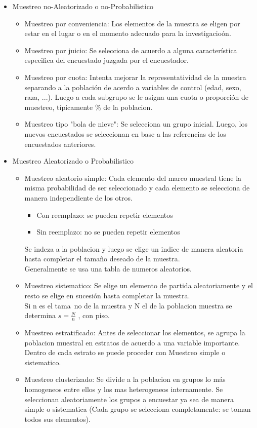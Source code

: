 		\begin{itemize}
			\item Muestreo no-Aleatorizado o no-Probabilistico
			\begin{itemize}
				\item Muestreo por conveniencia: Los elementos de la muestra se eligen por estar en el lugar o en el momento adecuado para la investigacio\'on. 
				\item Muestreo por juicio: Se selecciona de acuerdo a alguna caracter\'istica especifica del encuestado juzgada por el encuestador.
				\item Muestreo por cuota: Intenta mejorar la representatividad de la muestra separando a la poblaci\'on de acerdo a variables de control (edad, sexo, raza, ...). Luego a cada subgrupo se le asigna una cuota o proporci\'on de muestreo, t\'ipicamente \% de la poblacion.
				\item Muestreo tipo "bola de nieve": Se selecciona un grupo inicial. Luego, los nuevos encuestados se seleccionan en base a las referencias de los encuestados anteriores.
			\end{itemize}
			\item Muestreo Aleatorizado o Probabilistico
			\begin{itemize}
				\item Muestreo aleatorio simple: Cada elemento del marco muestral tiene la misma probabilidad de ser seleccionado y cada elemento se selecciona de manera independiente de los otros.
				 \begin{itemize}
					\item Con reemplazo: se pueden repetir elementos
					\item Sin reemplazo: no se pueden repetir elementos
				 \end{itemize}
				Se indeza a la poblacion y luego se elige un indice de manera aleatoria hasta completar el tama\~no deseado de la muestra.\\
				Generalmente se usa una tabla de numeros aleatorios.\\
				\item Muestreo sistematico: Se elige un elemento de partida aleatoriamente y el resto se elige en sucesi\'on hasta completar la muestra.\\
				Si n es el tama~no de la muestra y N el de la poblacion muestra se determina $ s = \frac{N}{n}$ , con piso.
				\item Muestreo estratificado: Antes de seleccionar los elementos, se agrupa la poblacion muestral en estratos de acuerdo a una variable importante. Dentro de cada estrato se puede proceder con Muestreo simple o sistematico.
				\item Muestreo clusterizado: Se divide a la poblacion en grupos lo m\'as homogeneos entre ellos y los mas heterogeneos internamente. Se seleccionan aleatoriamente los grupos a encuestar ya sea de manera simple o sistematica (Cada grupo se selecciona completamente: se toman todos sus elementos).
			\end{itemize}
		\end{itemize}
